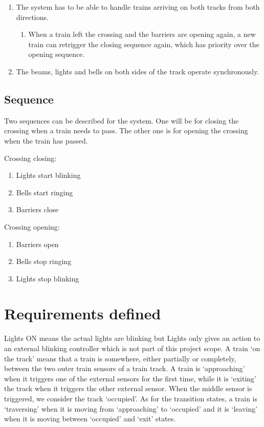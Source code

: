 \documentclass[final]{report}
\begin{document}
\begin{enumerate}
\item The system has to be able to handle trains arriving on both tracks from both directions.
	\begin{enumerate}
	\item When a train left the crossing and the barriers are opening again, a new train can retrigger the closing sequence again, which has priority over the opening sequence.
	\end{enumerate}

\item The beams, lights and bells on both sides of the track operate synchronously.
\end{enumerate}


\subsection{Sequence}
Two sequences can be described for the system.
One will be for closing the crossing when a train needs to pass. The other one is for opening the crossing when the train has passed.

Crossing closing:
\begin{enumerate}
\item Lights start blinking
\item Bells start ringing
\item Barriers close
\end{enumerate}

Crossing opening:
\begin{enumerate}
\item Barriers open
\item Bells stop ringing
\item Lights stop blinking
\end{enumerate}

\section{Requirements defined}
Lights ON means the actual lights are blinking but Lights only gives an action to an external blinking controller which is not part of this project scope.
A train `on the track' means that a train is somewhere, either partially or completely, between the two outer train sensors of a train track.
A train is `approaching' when it triggers one of the external sensors for the first time, while it is `exiting' the track when it triggers the other external sensor.
When the middle sensor is triggered, we consider the track `occupied'.
As for the transition states, a train is `traversing' when it is moving from `approaching' to `occupied' and it is `leaving' when it is moving between `occupied' and `exit' states.
\end{document}
